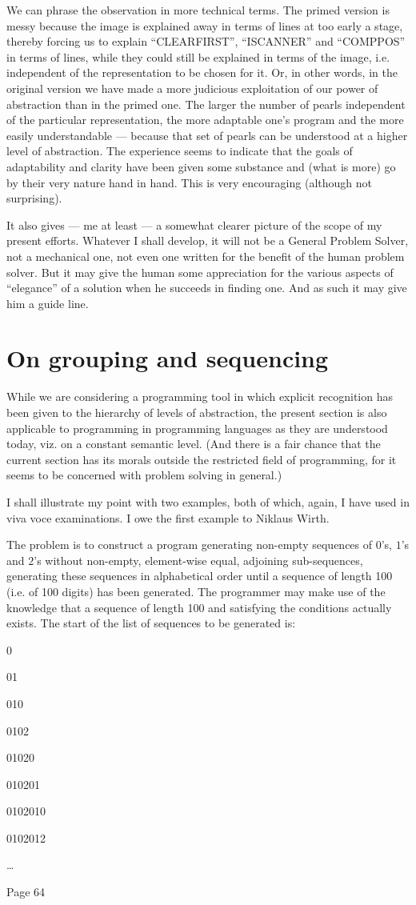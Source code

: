 We can phrase the observation in more technical terms. The primed version is messy because the image is explained away in terms of lines at too early a stage, thereby forcing us to explain ``CLEARFIRST'', ``ISCANNER'' and ``COMPPOS'' in terms of lines, while they could still be explained in terms of the image, i.e. independent of the representation to be chosen for it. Or, in other words, in the original version we have made a more judicious exploitation of our power of abstraction than in the primed one. The larger the number of pearls independent of the particular representation, the more adaptable one's program and the more easily understandable --- because that set of pearls can be understood at a higher level of abstraction. The experience seems to indicate that the goals of adaptability and clarity have been given some substance and (what is more) go by their very nature hand in hand. This is very encouraging (although not surprising).

It also gives --- me at least --- a somewhat clearer picture of the scope of my present efforts. Whatever I shall develop, it will not be a General Problem Solver, not a mechanical one, not even one written for the benefit of the human problem solver. But it may give the human some appreciation for the various aspects of ``elegance'' of a solution when he succeeds in finding one. And as such it may give him a guide line.

\section{On grouping and sequencing}

While we are considering a programming tool in which explicit recognition has been given to the hierarchy of levels of abstraction, the present section is also applicable to programming in programming languages as they are understood today, viz. on a constant semantic level. (And there is a fair chance that the current section has its morals outside the restricted field of programming, for it seems to be concerned with problem solving in general.)

I shall illustrate my point with two examples, both of which, again, I have used in viva voce examinations. I owe the first example to Niklaus Wirth.

The problem is to construct a program generating non-empty sequences of $0$'s, $1$'s and $2$'s without non-empty, element-wise equal, adjoining sub-sequences, generating these sequences in alphabetical order until a sequence of length 100 (i.e. of 100 digits) has been generated. The programmer may make use of the knowledge that a sequence of length 100 and satisfying the conditions actually exists. The start of the list of sequences to be generated is:

0

01

010

0102

01020

010201

0102010

0102012

\dots

Page 64
